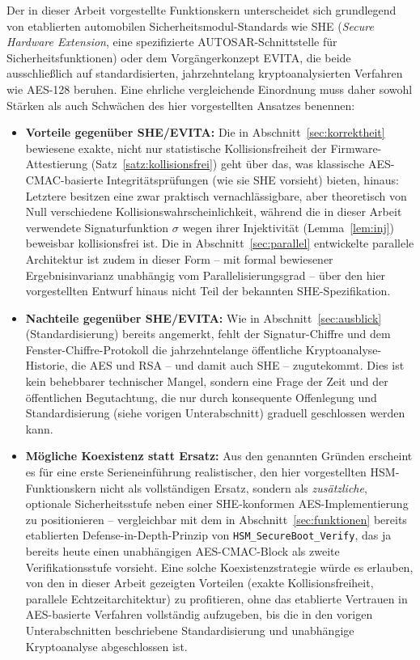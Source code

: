 ﻿\documentclass[a4paper,12pt]{article}
\theoremstyle{definition}
\begin{document}
Der in dieser Arbeit vorgestellte Funktionskern unterscheidet sich grundlegend von etablierten automobilen Sicherheitsmodul-Standards wie SHE (\emph{Secure Hardware Extension}, eine spezifizierte AUTOSAR-Schnittstelle für Sicherheitsfunktionen) oder dem Vorgängerkonzept EVITA, die beide ausschließlich auf standardisierten, jahrzehntelang kryptoanalysierten Verfahren wie AES-128 beruhen. Eine ehrliche vergleichende Einordnung muss daher sowohl Stärken als auch Schwächen des hier vorgestellten Ansatzes benennen:

\begin{itemize}
	\item \textbf{Vorteile gegenüber SHE/EVITA:} Die in Abschnitt~\ref{sec:korrektheit} bewiesene exakte, nicht nur statistische Kollisionsfreiheit der Firmware-Attestierung (Satz~\ref{satz:kollisionsfrei}) geht über das, was klassische AES-CMAC-basierte Integritätsprüfungen (wie sie SHE vorsieht) bieten, hinaus: Letztere besitzen eine zwar praktisch vernachlässigbare, aber theoretisch von Null verschiedene Kollisionswahrscheinlichkeit, während die in dieser Arbeit verwendete Signaturfunktion $\sigma$ wegen ihrer Injektivität (Lemma~\ref{lem:inj}) beweisbar kollisionsfrei ist. Die in Abschnitt~\ref{sec:parallel} entwickelte parallele Architektur ist zudem in dieser Form -- mit formal bewiesener Ergebnisinvarianz unabhängig vom Parallelisierungsgrad -- über den hier vorgestellten Entwurf hinaus nicht Teil der bekannten SHE-Spezifikation.
	\item \textbf{Nachteile gegenüber SHE/EVITA:} Wie in Abschnitt~\ref{sec:ausblick} (Standardisierung) bereits angemerkt, fehlt der Signatur-Chiffre und dem Fenster-Chiffre-Protokoll die jahrzehntelange öffentliche Kryptoanalyse-Historie, die AES und RSA -- und damit auch SHE -- zugutekommt. Dies ist kein behebbarer technischer Mangel, sondern eine Frage der Zeit und der öffentlichen Begutachtung, die nur durch konsequente Offenlegung und Standardisierung (siehe vorigen Unterabschnitt) graduell geschlossen werden kann.
	\item \textbf{Mögliche Koexistenz statt Ersatz:} Aus den genannten Gründen erscheint es für eine erste Serieneinführung realistischer, den hier vorgestellten HSM-Funktionskern nicht als vollständigen Ersatz, sondern als \emph{zusätzliche}, optionale Sicherheitsstufe neben einer SHE-konformen AES-Implementierung zu positionieren -- vergleichbar mit dem in Abschnitt~\ref{sec:funktionen} bereits etablierten Defense-in-Depth-Prinzip von \texttt{HSM\_SecureBoot\_Verify}, das ja bereits heute einen unabhängigen AES-CMAC-Block als zweite Verifikationsstufe vorsieht. Eine solche Koexistenzstrategie würde es erlauben, von den in dieser Arbeit gezeigten Vorteilen (exakte Kollisionsfreiheit, parallele Echtzeitarchitektur) zu profitieren, ohne das etablierte Vertrauen in AES-basierte Verfahren vollständig aufzugeben, bis die in den vorigen Unterabschnitten beschriebene Standardisierung und unabhängige Kryptoanalyse abgeschlossen ist.
\end{itemize}
\end{document}
